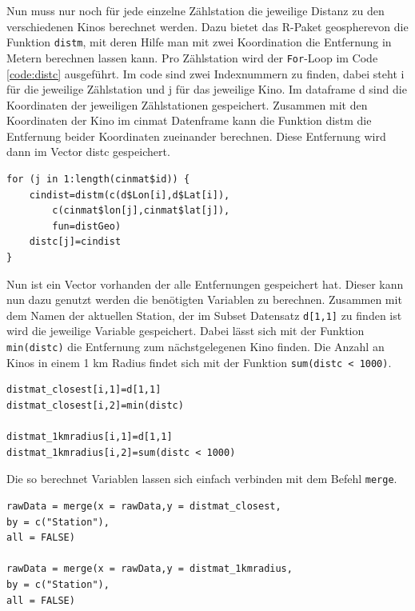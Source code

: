 \documentclass[a4paper,12pt]{thesis}
\begin{document}
Nun muss nur noch für jede einzelne Zählstation die jeweilige Distanz zu den verschiedenen Kinos berechnet werden. Dazu bietet das R-Paket \glqq geosphere\grqq von \cite{Hijmans2021} die Funktion \lstinline|distm|, mit deren Hilfe man mit zwei Koordination die Entfernung in Metern berechnen lassen kann. Pro Zählstation wird der \lstinline|For|-Loop im Code \ref{code:distc} ausgeführt. Im code sind zwei Indexnummern zu finden, dabei steht i für die jeweilige Zählstation und j für das jeweilige Kino. Im dataframe d sind die Koordinaten der jeweiligen Zählstationen gespeichert. Zusammen mit den Koordinaten der Kino im cinmat Datenframe kann die Funktion distm die Entfernung beider Koordinaten zueinander berechnen. Diese Entfernung wird dann im Vector distc gespeichert.

\begin{lstlisting}[caption={Berechnung der Entfernung},label=code:distc]
for (j in 1:length(cinmat$id)) {
	cindist=distm(c(d$Lon[i],d$Lat[i]),
		c(cinmat$lon[j],cinmat$lat[j]), 
		fun=distGeo)
	distc[j]=cindist
}
\end{lstlisting}

Nun ist ein Vector vorhanden der alle Entfernungen gespeichert hat. Dieser kann nun dazu genutzt werden die benötigten Variablen zu berechnen. Zusammen mit dem Namen der aktuellen Station, der im Subset Datensatz \lstinline|d[1,1]| zu finden ist wird die jeweilige Variable gespeichert. Dabei lässt sich mit der Funktion \lstinline|min(distc)| die Entfernung zum nächstgelegenen Kino finden. Die Anzahl an Kinos in einem 1 km Radius findet sich mit der Funktion \lstinline|sum(distc < 1000)|.

\begin{lstlisting}[caption={Berechnung der Entfernungsvariablen},label=code:dist_variables]
distmat_closest[i,1]=d[1,1]
distmat_closest[i,2]=min(distc)

distmat_1kmradius[i,1]=d[1,1]
distmat_1kmradius[i,2]=sum(distc < 1000)
\end{lstlisting}

Die so berechnet Variablen lassen sich einfach verbinden mit dem Befehl \lstinline|merge|.

\begin{lstlisting}[caption={Füge neue Variablen dem Datensatz hinzu},label=code:dist_variables2]
rawData = merge(x = rawData,y = distmat_closest,
by = c("Station"),
all = FALSE)

rawData = merge(x = rawData,y = distmat_1kmradius,
by = c("Station"),
all = FALSE)
\end{lstlisting}
\end{document}
